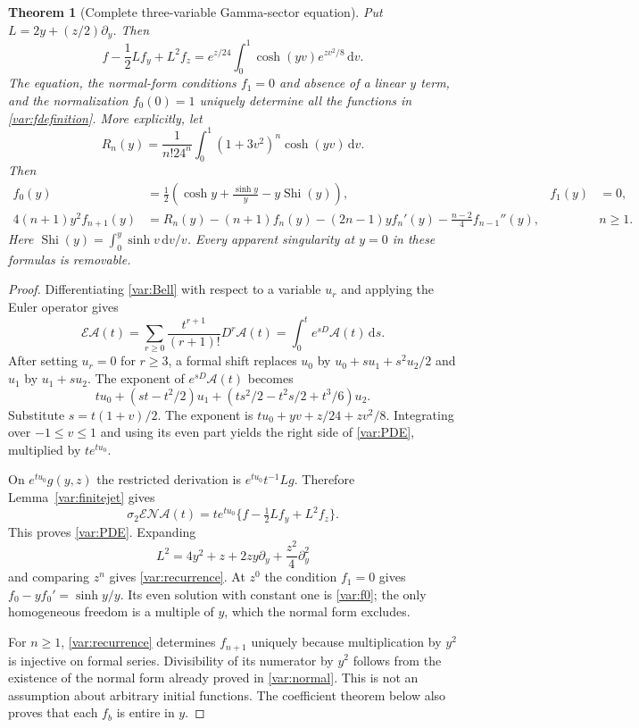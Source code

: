 \documentclass[11pt,letterpaper]{article}
\numberwithin{equation}{section}
\theoremstyle{plain}
\newtheorem{theorem}{Theorem}[section]
\theoremstyle{definition}
\theoremstyle{remark}
\newcommand{\dd}{\,\mathrm d}\newcommand{\iu}{\mathrm i}
\newcommand{\NN}{\mathcal N}\newcommand{\HH}{\mathcal H}
\newcommand{\Acal}{\mathcal A}\newcommand{\cA}{\mathcal A}
\DeclareMathOperator{\Shi}{Shi}\DeclareMathOperator{\wt}{wt}
\begin{document}
\begin{theorem}[Complete three-variable Gamma-sector equation]
\label{var:master}
Put $L=2y+(z/2)\partial_y$. Then
\begin{equation}\label{var:PDE}
 \boxed{\displaystyle
 f-\frac12L f_y+L^2f_z
 =e^{z/24}\int_0^1
          \cosh(yv)e^{zv^2/8}\dd v.}
\end{equation}
The equation, the normal-form conditions $f_1=0$ and absence of a
linear $y$ term, and the normalization $f_0(0)=1$ uniquely determine
all the functions in \eqref{var:fdefinition}.
More explicitly, let
\begin{equation}\label{var:Rn}
 R_n(y)=\frac1{n!24^n}\int_0^1(1+3v^2)^n\cosh(yv)\dd v.
\end{equation}
Then
\begin{align}
 f_0(y)&=\frac12\left(
       \cosh y+\frac{\sinh y}{y}-y\Shi(y)\right),
       & f_1(y)&=0,\label{var:f0}\\
 4(n+1)y^2f_{n+1}(y)
 &=R_n(y)-(n+1)f_n(y)-(2n-1)y f_n'(y)
           -\frac{n-2}{4}f_{n-1}''(y),
       && n\ge1.\label{var:recurrence}
\end{align}
Here $\Shi(y)=\int_0^y\sinh v\dd v/v$. Every apparent singularity
at $y=0$ in these formulas is removable.
\end{theorem}
\begin{proof}
Differentiating \eqref{var:Bell} with respect to a variable $u_r$
and applying the Euler operator gives
\begin{equation}\label{var:EA}
 \mathscr E\Acal(t)
 =\sum_{r\ge0}\frac{t^{r+1}}{(r+1)!}D^r\Acal(t)
 =\int_0^t e^{sD}\Acal(t)\dd s.
\end{equation}
After setting $u_r=0$ for $r\ge3$, a formal shift replaces $u_0$
by $u_0+s u_1+s^2u_2/2$ and $u_1$ by $u_1+s u_2$.
The exponent of $e^{sD}\Acal(t)$ becomes
\[
 tu_0+(st-t^2/2)u_1+
       (ts^2/2-t^2s/2+t^3/6)u_2.
\]
Substitute $s=t(1+v)/2$. The exponent is
$tu_0+yv+z/24+zv^2/8$. Integrating over $-1\le v\le1$
and using its even part yields the right side of
\eqref{var:PDE}, multiplied by $te^{tu_0}$.

On $e^{tu_0}g(y,z)$ the restricted derivation is
$e^{tu_0}t^{-1}Lg$. Therefore Lemma~\ref{var:finitejet} gives
\[
 \sigma_2\mathscr E\NN\Acal(t)
 =te^{tu_0}\{f-\tfrac12Lf_y+L^2f_z\}.
\]
This proves \eqref{var:PDE}. Expanding
\[
 L^2=4y^2+z+2zy\partial_y+\frac{z^2}{4}\partial_y^2
\]
and comparing $z^n$ gives \eqref{var:recurrence}. At $z^0$ the
condition $f_1=0$ gives
$f_0-yf_0'=\sinh y/y$. Its even solution with constant one is
\eqref{var:f0}; the only homogeneous freedom is a multiple of $y$,
which the normal form excludes.

For $n\ge1$, \eqref{var:recurrence} determines $f_{n+1}$ uniquely
because multiplication by $y^2$ is injective on formal series.
Divisibility of its numerator by $y^2$ follows from the existence of
the normal form already proved in \eqref{var:normal}. This is not an
assumption about arbitrary initial functions. The coefficient theorem
below also proves that each $f_b$ is entire in $y$.
\end{proof}
\end{document}
